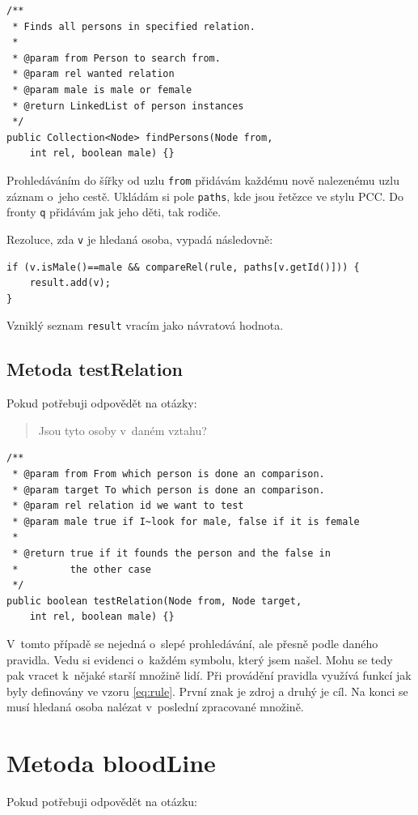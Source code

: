 \documentclass[a4paper, 12pt]{article}
\begin{document}
\begin{verbatim}
/**
 * Finds all persons in specified relation.
 * 
 * @param from Person to search from.
 * @param rel wanted relation
 * @param male is male or female
 * @return LinkedList of person instances
 */
public Collection<Node> findPersons(Node from,
    int rel, boolean male) {}
\end{verbatim}

Prohledáváním do šířky od uzlu \texttt{from} přidávám každému
nově nalezenému uzlu záznam o~jeho cestě. Ukládám si pole
\texttt{paths}, kde jsou řetězce ve stylu PCC. Do fronty \texttt{q}
přidávám jak jeho děti, tak rodiče.

Rezoluce, zda \texttt{v} je hledaná osoba, vypadá následovně:

\begin{verbatim}
if (v.isMale()==male && compareRel(rule, paths[v.getId()])) {
    result.add(v);
}
\end{verbatim}

Vzniklý seznam \texttt{result} vracím jako návratová hodnota.

\subsection{Metoda testRelation}
Pokud potřebuji odpovědět na otázky:

\begin{quote}
Jsou tyto osoby v~daném vztahu?
\end{quote}

\begin{verbatim}
/**
 * @param from From which person is done an comparison.
 * @param target To which person is done an comparison.
 * @param rel relation id we want to test
 * @param male true if I~look for male, false if it is female
 * 
 * @return true if it founds the person and the false in
 *         the other case
 */
public boolean testRelation(Node from, Node target,
    int rel, boolean male) {}
\end{verbatim}

V~tomto případě se nejedná o~slepé prohledávání, ale přesně podle
daného pravidla. Vedu si evidenci o~každém symbolu, který
jsem našel. Mohu se tedy pak vracet k~nějaké starší množině lidí.
Při provádění pravidla využívá funkcí jak byly definovány ve vzoru \ref{eq:rule}.
První znak je zdroj a druhý je cíl. Na konci se musí hledaná osoba nalézat
v~poslední zpracované množině.

\section{Metoda bloodLine}
Pokud potřebuji odpovědět na otázku:
\end{document}
